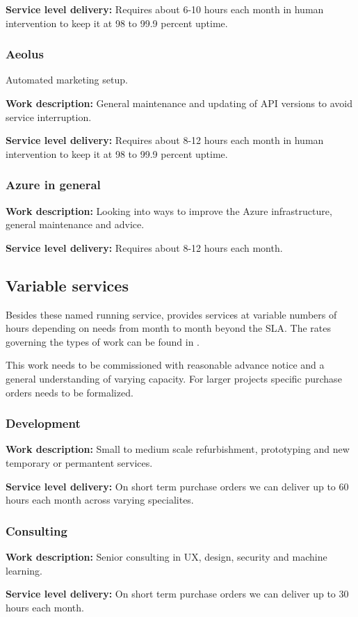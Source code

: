 \textbf{Service level delivery:} Requires about 6-10 hours each month in human intervention to keep it at 98 to 99.9 percent uptime.

\subsubsection{Aeolus}
Automated marketing setup.

\textbf{Work description:} General maintenance and updating of API versions to avoid service interruption.

\textbf{Service level delivery:} Requires about 8-12 hours each month in human intervention to keep it at 98 to 99.9 percent uptime.

\subsubsection{Azure in general}
\textbf{Work description:} Looking into ways to improve the Azure infrastructure, general maintenance and advice.

\textbf{Service level delivery:} Requires about 8-12 hours each month.

\subsection{Variable services}
Besides these named running service, \suppliername provides services at variable numbers of hours depending on \customername needs from month to month beyond the SLA. The rates governing the types of work can be found in .

This work needs to be commissioned with reasonable advance notice and a general understanding of varying capacity. For larger projects specific purchase orders needs to be formalized.

\subsubsection{Development}
\textbf{Work description:} Small to medium scale refurbishment, prototyping and new temporary or permantent services.

\textbf{Service level delivery:} On short term purchase orders we can deliver up to 60 hours each month across varying specialites.

\subsubsection{Consulting}
\textbf{Work description:} Senior consulting in UX, design, security and machine learning.

\textbf{Service level delivery:} On short term purchase orders we can deliver up to 30 hours each month.


